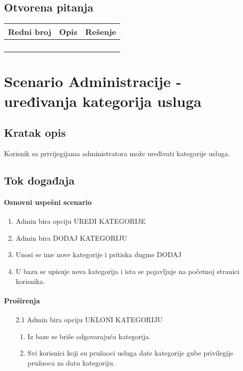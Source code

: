 \documentclass[a4paper,12pt]{report}
\newcommand{\genitivfunkcionalnosti}{Administracije - uređivanja kategorija usluga}
\begin{document}
		\subsection{Otvorena pitanja}
			\begin{tabular}{ |c|p{10cm}|l| }
				\hline
				\textbf{Redni broj} & \textbf{Opis} & \textbf{Rešenje} \\ 
				\hline
			    & &  \\
				\hline
			    &  & \\
				\hline
				&  & \\
				\hline
				&  & \\
				\hline
			\end{tabular}
	\section{Scenario \genitivfunkcionalnosti}
		\subsection{Kratak opis}
			Korisnik sa privijegijama administratora može uređivati kategorije usluga.
		\newpage
		\subsection{Tok događaja}
			\paragraph*{Osnovni uspešni scenario}
				\begin{enumerate}
					\item Admin bira opciju UREDI KATEGORIJE
					\item Admin bira DODAJ KATEGORIJU
					\item Unosi se ime nove kategorije i pritiska dugme DODAJ
					\item U bazu se upisuje nova kategorija i ista se pojavljuje na početnoj stranici korisnika.
				\end{enumerate}
			\paragraph*{Proširenja}
				\begin{enumerate}
					\item[2.1] Admin bira opciju UKLONI KATEGORIJU
						\begin{enumerate}[noitemsep,topsep=-8pt]
							\item Iz baze se briše odgovarajuća kategorija.
							\item Svi korisnici koji su pružaoci usluga date kategorije gube privilegije pružaoca za datu kategoriju.
						\end{enumerate}
				\end{enumerate}
\end{document}
